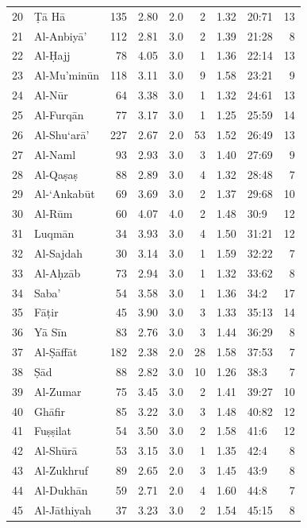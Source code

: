 \documentclass[11pt,a4paper]{article}
\begin{document}
\begin{table}[h]
\begin{minipage}[t]{0.48\textwidth}
\begin{tabular}{rl r r r r r lr}
20 & \d{T}\=a H\=a & 135 & 2.80 & 2.0 & 2 & 1.32 & 20:71 & 13 \\
21 & Al-Anbiy\=a' & 112 & 2.81 & 3.0 & 2 & 1.39 & 21:28 & 8 \\
22 & Al-\d{H}ajj & 78 & 4.05 & 3.0 & 1 & 1.36 & 22:14 & 13 \\
23 & Al-Mu'min\=un & 118 & 3.11 & 3.0 & 9 & 1.58 & 23:21 & 9 \\
24 & Al-N\=ur & 64 & 3.38 & 3.0 & 1 & 1.32 & 24:61 & 13 \\
25 & Al-Furq\=an & 77 & 3.17 & 3.0 & 1 & 1.25 & 25:59 & 14 \\
26 & Al-Shu`ar\=a' & 227 & 2.67 & 2.0 & 53 & 1.52 & 26:49 & 13 \\
27 & Al-Naml & 93 & 2.93 & 3.0 & 3 & 1.40 & 27:69 & 9 \\
28 & Al-Qa\d{s}a\d{s} & 88 & 2.89 & 3.0 & 4 & 1.32 & 28:48 & 7 \\
29 & Al-`Ankab\=ut & 69 & 3.69 & 3.0 & 2 & 1.37 & 29:68 & 10 \\
30 & Al-R\=um & 60 & 4.07 & 4.0 & 2 & 1.48 & 30:9 & 12 \\
31 & Luqm\=an & 34 & 3.93 & 3.0 & 4 & 1.50 & 31:21 & 12 \\
32 & Al-Sajdah & 30 & 3.14 & 3.0 & 1 & 1.59 & 32:22 & 7 \\
33 & Al-A\d{h}z\=ab & 73 & 2.94 & 3.0 & 1 & 1.32 & 33:62 & 8 \\
34 & Saba' & 54 & 3.58 & 3.0 & 1 & 1.36 & 34:2 & 17 \\
35 & F\=a\d{t}ir & 45 & 3.90 & 3.0 & 3 & 1.33 & 35:13 & 14 \\
36 & Y\=a S\=in & 83 & 2.76 & 3.0 & 3 & 1.44 & 36:29 & 8 \\
37 & Al-\d{S}\=aff\=at & 182 & 2.38 & 2.0 & 28 & 1.58 & 37:53 & 7 \\
38 & \d{S}\=ad & 88 & 2.82 & 3.0 & 10 & 1.26 & 38:3 & 7 \\
39 & Al-Zumar & 75 & 3.45 & 3.0 & 2 & 1.41 & 39:27 & 10 \\
40 & Gh\=afir & 85 & 3.22 & 3.0 & 3 & 1.48 & 40:82 & 12 \\
41 & Fu\d{s}\d{s}ilat & 54 & 3.50 & 3.0 & 2 & 1.58 & 41:6 & 12 \\
42 & Al-Sh\=ur\=a & 53 & 3.15 & 3.0 & 1 & 1.35 & 42:4 & 8 \\
43 & Al-Zukhruf & 89 & 2.65 & 2.0 & 3 & 1.45 & 43:9 & 8 \\
44 & Al-Dukh\=an & 59 & 2.71 & 2.0 & 4 & 1.60 & 44:8 & 7 \\
45 & Al-J\=athiyah & 37 & 3.23 & 3.0 & 2 & 1.54 & 45:15 & 8 \\

\end{tabular}
\end{minipage}
\end{table}
\end{document}
